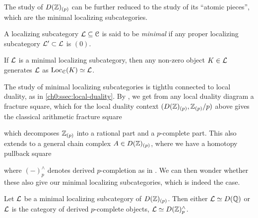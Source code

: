 The study of $D(\mathbb{Z})_{(p)}$ can be further reduced to the study of its ``atomic pieces'', which are the minimal localizing subcategories. 

\begin{definition}
    \label{ch0:def:minimal-localizing-subcategory}
    A localizing subcategory $\mathcal{L}\subseteq \EuScript{C}$ is said to be \emph{minimal} if any proper localizing subcategory $\mathcal{L}'\subset \mathcal{L}$ is $(0)$.  
\end{definition}

\begin{remark}
    If $\mathcal{L}$ is a minimal localizing subcategory, then any non-zero object $K\in \mathcal{L}$ generates $\mathcal{L}$ as $\operatorname{Loc}_{\EuScript{C}}(K)\simeq \mathcal{L}$.
\end{remark}

The study of minimal localizing subcategories is tightlu connected to local duality, as in \cref{ch0:ssec:local-duality}. By \cite[2.26]{barthel-heard-valenzuela_2018}, we get from any local duality diagram a fracture square, which for the local duality context $(D(\mathbb{Z})_{(p)}, \mathbb{Z}_{(p)}/p)$ above gives the classical arithmetic fracture square
\begin{center}
\end{center}
which decomposes $\mathbb{Z}_{(p)}$ into a rational part and a $p$-complete part. This also extends to a general chain complex $A\in D(\mathbb{Z})_{(p)}$, where we have a homotopy pullback square 
\begin{center}
\end{center}
where $(-)_p^\wedge$ denotes derived $p$-completion as in \crefme. We can then wonder whether these also give our minimal localizing subcategories, which is indeed the case. 

\begin{proposition}
    Let $\mathcal{L}$ be a minimal localizing subcategory of $D(\mathbb{Z})_{(p)}$. Then either $\mathcal{L} \simeq D(\mathbb{Q})$ or $\mathcal{L}$ is the category of derived $p$-complete objects, $\mathcal{L}\simeq D(\mathbb{Z})^\wedge_p$.
\end{proposition}

